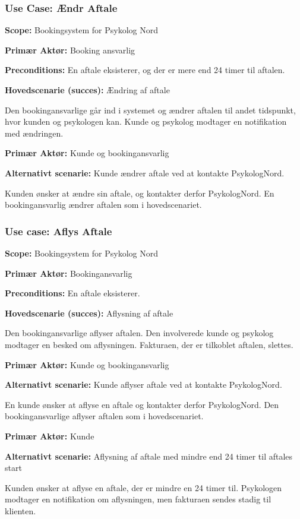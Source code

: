 \subsubsection{Use Case: Ændr Aftale}
{\setlength{\parindent}{0cm}
\textbf{Scope:} Bookingsystem for Psykolog Nord

\textbf{Primær Aktør:} Booking ansvarlig 

\textbf{Preconditions:} En aftale eksisterer, og der er mere end 24 timer til aftalen.

\textbf{Hovedscenarie (succes):} Ændring af aftale

Den bookingansvarlige går ind i systemet og ændrer aftalen til andet tidspunkt, hvor kunden og psykologen kan.
Kunde og psykolog modtager en notifikation med ændringen.

\textbf{Primær Aktør:} Kunde og bookingansvarlig

\textbf{Alternativt scenarie:} Kunde ændrer aftale ved at kontakte PsykologNord.

Kunden ønsker at ændre sin aftale, og kontakter derfor PsykologNord.
En bookingansvarlig ændrer aftalen som i hovedscenariet.
}

\subsubsection{Use case: Aflys Aftale}
{\setlength{\parindent}{0cm}
\textbf{Scope:} Bookingsystem for Psykolog Nord

\textbf{Primær Aktør:} Bookingansvarlig

\textbf{Preconditions:} En aftale eksisterer.

\textbf{Hovedscenarie (succes):} Aflysning af aftale

Den bookingansvarlige aflyser aftalen.
Den involverede kunde og psykolog modtager en besked om aflysningen. Fakturaen, der er tilkoblet aftalen, slettes.

\textbf{Primær Aktør:} Kunde og bookingansvarlig

\textbf{Alternativt scenarie:} Kunde aflyser aftale ved at kontakte PsykologNord.

En kunde ønsker at aflyse en aftale og kontakter derfor PsykologNord.
Den bookingansvarlige aflyser aftalen som i hovedscenariet.

\textbf{Primær Aktør:} Kunde

\textbf{Alternativt scenarie:} Aflysning af aftale med mindre end 24 timer til aftales start

Kunden ønsker at aflyse en aftale, der er mindre en 24 timer til.
Psykologen modtager en notifikation om aflysningen, men fakturaen sendes stadig til klienten.
}

